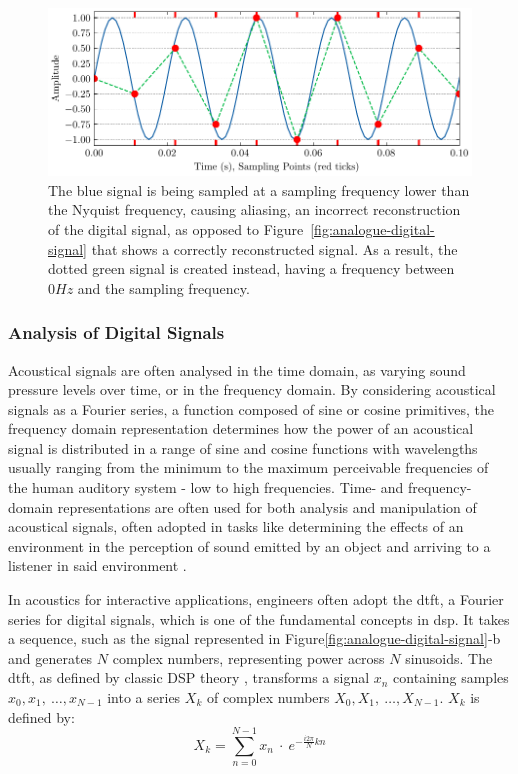 \begin{figure}
    \centering
    \includegraphics[width=1\linewidth]{aliasing}
    \caption[Digital reconstruction of analogue signal]{The blue signal is being sampled at a sampling frequency lower than the Nyquist frequency, causing aliasing, an incorrect reconstruction of the digital signal, as opposed to Figure~\ref{fig:analogue-digital-signal} that shows a correctly reconstructed signal. As a result, the dotted green signal is created instead, having a frequency between $0Hz$ and the sampling frequency.}
\label{fig:aliasing}
\end{figure}

\subsubsection{Analysis of Digital Signals}
Acoustical signals are often analysed in the time domain, as varying sound pressure levels over time, or in the frequency domain. By considering acoustical signals as a Fourier series, a function composed of sine or cosine primitives, the frequency domain representation determines how the power of an acoustical signal is distributed in a range of sine and cosine functions with wavelengths usually ranging from the minimum to the maximum perceivable frequencies of the human auditory system - low to high frequencies. Time- and frequency-domain representations are often used for both analysis and manipulation of acoustical signals, often adopted in tasks like determining the effects of an environment in the perception of sound emitted by an object and arriving to a listener in said environment \cite{ballou2013handbook}. \par 
In acoustics for interactive applications, engineers often adopt the \acrfull{dtft}, a Fourier series for digital signals, which is one of the fundamental concepts in \acrshort{dsp}. It takes a sequence, such as the signal represented in Figure\ref{fig:analogue-digital-signal}-b and generates $N$ complex numbers, representing power across $N$ sinusoids. The \acrshort{dtft}, as defined by classic DSP theory \cite{shenoi2005introduction}, transforms a signal $x_n$ containing samples $x_0, x_1,~\dots, x_{N-1}$ into a series $X_k$ of complex numbers $X_0, X_1,~\dots, X_{N-1}$. $X_k$ is defined by:
\begin{equation}
    X_k = \sum_{n=0}^{N-1} x_n~\cdot~e^{-\frac{i2\pi}{N}kn}
\end{equation}

